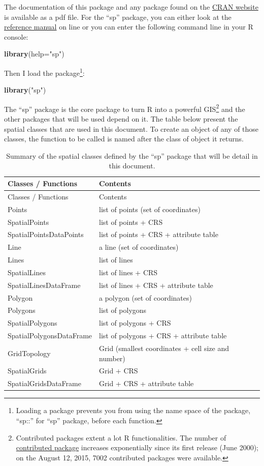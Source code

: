 \documentclass[]{report}
\newenvironment{Shaded}{\begin{snugshade}}{\end{snugshade}}
\newcommand{\DataTypeTok}[1]{\textcolor[rgb]{0.13,0.29,0.53}{#1}}
\newcommand{\KeywordTok}[1]{\textcolor[rgb]{0.13,0.29,0.53}{\textbf{#1}}}
\newcommand{\NormalTok}[1]{#1}
\newcommand{\StringTok}[1]{\textcolor[rgb]{0.31,0.60,0.02}{#1}}
\let\rmarkdownfootnote\footnote%
\def\footnote{\protect\rmarkdownfootnote}
\begin{document}
The documentation of this package and any package found on the
\href{http://cran.r-project.org/doc/manuals/r-release/R-intro.html}{CRAN
website} is available as a pdf file. For the ``sp'' package, you can
either look at the
\href{http://cran.r-project.org/web/packages/sp/index.html}{reference
manual} on line or you can enter the following command line in your R
console:

\begin{Shaded}
\begin{Highlighting}[]
\KeywordTok{library}\NormalTok{(}\DataTypeTok{help=}\StringTok{"sp"}\NormalTok{)}
\end{Highlighting}
\end{Shaded}

Then I load the package\footnote{Loading a package prevents you from
  using the name space of the package, ``sp::'' for ``sp'' package,
  before each function.}:

\begin{Shaded}
\begin{Highlighting}[]
\KeywordTok{library}\NormalTok{(}\StringTok{"sp"}\NormalTok{)}
\end{Highlighting}
\end{Shaded}

The ``sp'' package is the core package to turn R into a powerful
GIS\footnote{Contributed packages extent a lot R functionalities. The
  number of \href{https://cran.r-project.org/web/packages/}{contributed
  package} increases exponentially since its first release (June 2000);
  on the August 12, 2015, 7002 contributed packages were available.} and
the other packages that will be used depend on it. The table below
present the spatial classes that are used in this document. To create an
object of any of those classes, the function to be called is named after
the class of object it returns.

\begin{longtable}[]{@{}ll@{}}
\caption{Summary of the spatial classes defined by the ``sp'' package
that will be detail in this document.}\tabularnewline
\toprule
Classes / Functions & Contents\tabularnewline
\midrule
\endfirsthead
\toprule
Classes / Functions & Contents\tabularnewline
\midrule
\endhead
Points & list of points (set of coordinates)\tabularnewline
SpatialPoints & list of points + CRS\tabularnewline
SpatialPointsDataPoints & list of points + CRS + attribute
table\tabularnewline
Line & a line (set of coordinates)\tabularnewline
Lines & list of lines\tabularnewline
SpatialLines & list of lines + CRS\tabularnewline
SpatialLinesDataFrame & list of lines + CRS + attribute
table\tabularnewline
Polygon & a polygon (set of coordinates)\tabularnewline
Polygons & list of polygons\tabularnewline
SpatialPolygons & list of polygons + CRS\tabularnewline
SpatialPolygonsDataFrame & list of polygons + CRS + attribute
table\tabularnewline
GridTopology & Grid (smallest coordinates + cell size and
number)\tabularnewline
SpatialGrids & Grid + CRS\tabularnewline
SpatialGridsDataFrame & Grid + CRS + attribute table\tabularnewline
\bottomrule
\end{longtable}
\end{document}
